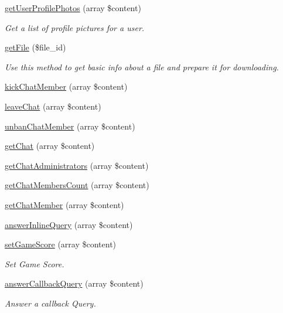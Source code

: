 \begin{DoxyCompactItemize}
\hyperlink{class_telegram_af2245dc488830eb7add02c35e8dcf492}{get\+User\+Profile\+Photos} (array \$content)
\begin{DoxyCompactList}\small\item\em Get a list of profile pictures for a user. \end{DoxyCompactList}\item 
\hyperlink{class_telegram_acb201ffc034063cfd347962c49ad5ad9}{get\+File} (\$file\+\_\+id)
\begin{DoxyCompactList}\small\item\em Use this method to get basic info about a file and prepare it for downloading. \end{DoxyCompactList}\item 
\hyperlink{class_telegram_a165397f59469136d25b445a83b6fd13b}{kick\+Chat\+Member} (array \$content)
\item 
\hyperlink{class_telegram_ab5d2552e116deb2f9c3940f3e09b4e7a}{leave\+Chat} (array \$content)
\item 
\hyperlink{class_telegram_abb59232bb0fd79760521c8e81ea0f9b8}{unban\+Chat\+Member} (array \$content)
\item 
\hyperlink{class_telegram_a84b0d627829ac32122cf771094f3cffb}{get\+Chat} (array \$content)
\item 
\hyperlink{class_telegram_a9ef409fa4668818b134c349553ccebd9}{get\+Chat\+Administrators} (array \$content)
\item 
\hyperlink{class_telegram_aaeb16972df57138d5efa3579085ebb5f}{get\+Chat\+Members\+Count} (array \$content)
\item 
\hyperlink{class_telegram_a744f71c0b62f310e2b2c665071509fec}{get\+Chat\+Member} (array \$content)
\item 
\hyperlink{class_telegram_aae2439e89943ccea30fd724ad5ae9a89}{answer\+Inline\+Query} (array \$content)
\item 
\hyperlink{class_telegram_adc67d74632a07c0f50875d8e35304463}{set\+Game\+Score} (array \$content)
\begin{DoxyCompactList}\small\item\em Set Game Score. \end{DoxyCompactList}\item 
\hyperlink{class_telegram_a55fa1d6bbcca385e333b402894e8ca37}{answer\+Callback\+Query} (array \$content)
\begin{DoxyCompactList}\small\item\em Answer a callback Query. \end{DoxyCompactList}\item 

\end{DoxyCompactItemize}
